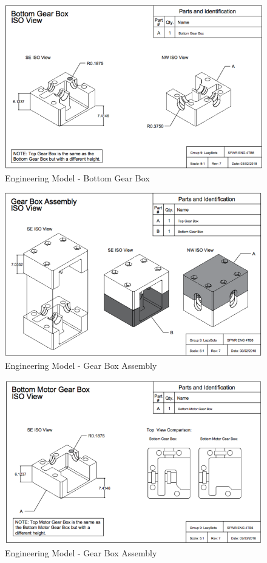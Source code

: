 \documentclass [10pt]{article}
\begin{document}
\begin{figure}[H]
	\centering
	\includegraphics [scale = 0.55] {figures/CAD_Bottom_GB.png}
	\caption{Engineering Model - Bottom Gear Box}
\end{figure}

\begin{figure}[H]
	\centering
	\includegraphics [scale = 0.55] {figures/CAD_GB_Assembly.png}
	\caption{Engineering Model - Gear Box Assembly}
\end{figure}

\begin{figure}[H]
	\centering
	\includegraphics [scale = 0.55] {figures/CAD_Bottom_Motor_GB.png}
	\caption{Engineering Model - Gear Box Assembly}
\end{figure}
\end{document}

